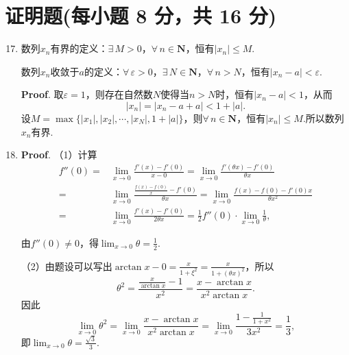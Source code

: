 \documentclass[../main.tex]{subfiles}
\begin{document}
\section{证明题(每小题 8 分，共 16 分)}
\begin{enumerate}
    \setcounter{enumi}{16}
    \item 数列$x_{n}$有界的定义：$\exists\,M>0$，$\forall\,n\in\mathbf{N}$，恒有$|
              x_{n}|\leq M$.

          数列$x_{n}$收敛于$a$的定义：$\forall\,\varepsilon>0$，$\exists\,N\in\mathbf{N}$，$\forall
              \,n>N$，恒有$|x_{n}-a|<\varepsilon$.

          \textbf{Proof}. 取$\varepsilon=1$，则存在自然数$N$使得当$n>N$时，恒有$|x_{n}
              -a|<1$，从而
          \[
              |x_{n}|=|x_{n}-a+a|<1+|a|.
          \]
          设$M=\max\{|x_{1}|,|x_{2}|,\cdots,|x_{N}|,1+|a|\}$，则$\forall\,n\in\mathbf{N}$，恒有$|
              x_{n}|\leq M$.所以数列$x_{n}$有界.

    \item \textbf{Proof}. （1）计算
          \[
              \begin{aligned}
                  f''(0)= {} & \lim_{x\to0}\frac{f'(x)-f'(0)}{x-0}= \lim_{x\to0}\frac{f'(\theta x)-f'(0)}{\theta x}                    \\
                  = {}       & \lim_{x\to0}\frac{\frac{f(x)-f(0)}{x}-f'(0)}{\theta x}= \lim_{x\to0}\frac{f(x)-f(0)-f'(0)x}{\theta x^2} \\
                  = {}       & \lim_{x\to0}\frac{f'(x)-f'(0)}{2\theta x}= \frac{1}{2}f''(0)\cdot\lim_{x\to0}\frac{1}{\theta},
              \end{aligned}
          \]

          由$f''(0)\neq0$，得$\lim_{x\to0}\theta=\frac{1}{2}$.

          （2）由题设可以写出$\arctan x-0=\frac{x}{1+\xi^{2}}=\frac{x}{1+(\theta x)^{2}}$，所以
          \[
              \theta^{2} = \frac{\frac{x}{\arctan x}-1}{x^{2}}= \frac{x-\arctan x}{x^{2}\arctan
                  x}.
          \]
          因此
          \[
              \lim_{x\to0}\theta^{2}=\lim_{x\to0}\frac{x-\arctan x}{x^{2}\arctan x}=
              \lim_{x\to0}\frac{1-\frac{1}{1+x^{2}}}{3x^{2}}=\frac{1}{3},
          \]
          即$\lim_{x\to0}\theta=\frac{\sqrt{3}}{3}$.
\end{enumerate}
\end{document}
